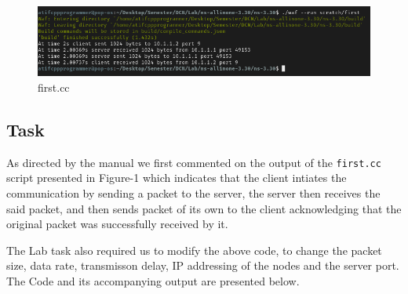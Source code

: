 \documentclass[fullpage]{article}
\begin{document}
\begin{figure}[h!]
  \includegraphics[width=\linewidth]{runFirst.png}
  \caption{first.cc}
  \label{fig:output1}
\end{figure}

\subsection{Task}

As directed by the manual we first commented on the output of the \verb|first.cc| script
presented in Figure-1 which indicates that the client intiates the communication by sending a
packet to the server, the server then receives the said packet, and then sends packet of its
own to the client acknowledging that the original packet was successfully received by it.

The Lab task also required us to modify the above code, to change the packet size, data rate,
transmisson delay, IP addressing of the nodes and the server port. The Code and its accompanying output
are presented below.
\end{document}
